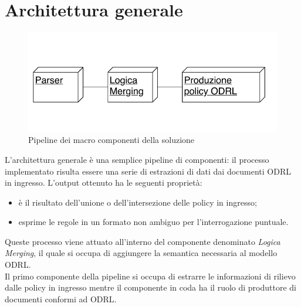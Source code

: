 \documentclass[12pt,a4paper,twoside]{book}
\begin{document}
\section{Architettura generale}
\begin{figure}[htp]
\centering
\includegraphics[scale=1]{../immagini/arch_gen.pdf}
\caption{Pipeline dei macro componenti della soluzione}
\label{archGenImpl}
\end{figure}
L'architettura generale è una semplice pipeline di componenti: il processo implementato risulta essere una serie di estrazioni di dati dai documenti ODRL in ingresso. L'output ottenuto ha le seguenti proprietà:
\begin{itemize}
\item è il risultato dell'unione o dell'intersezione delle policy in ingresso;
\item esprime le regole in un formato non ambiguo per l'interrogazione puntuale.
\end{itemize}
Queste processo viene attuato all'interno del componente denominato \textit{Logica Merging}, il quale si occupa di aggiungere la semantica necessaria al modello ODRL.\\
Il primo componente della pipeline si occupa di estrarre le informazioni di rilievo dalle policy in ingresso mentre il componente in coda ha il ruolo di produttore di documenti conformi ad ODRL.
\end{document}
